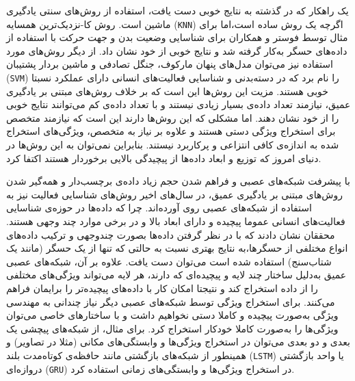 یک راهکار که در گذشته به نتایج خوبی دست یافت، استفاده از روش‌های سنتی یادگیری ماشین است. روش
کا-نزدیک‌ترین همسایه (\verb|KNN|)
اگرچه یک روش ساده است،‌اما برای مثال توسط
فوستر و همکاران\cite{foerster1999detection}
برای شناسایی وضعیت بدن و جهت حرکت با استفاده از داده‌های حسگر به‌کار گرفته شد و نتایج خوبی از خود نشان داد. از دیگر روش‌های مورد استفاده نیز می‌توان
مدل‌های پنهان مارکوف\cite{asghari2018activity}،
جنگل تصادفی\cite{attal2015physical}
و ماشین بردار پشتیبان (\verb|SVM|)\cite{attal2015physical}
را نام برد که در دسته‌بدنی و شناسایی فعالیت‌های انسانی دارای عملکرد نسبتا خوبی هستند. مزیت این روش‌ها این است که بر خلاف روش‌های مبتنی بر یادگیری عمیق،‌ نیازمند تعداد داده‌ی بسیار زیادی نیستند و با تعداد داده‌ی کم می‌توانند نتایج خوبی را از خود نشان دهند\cite{chen2021deep}.
اما مشکلی که این روش‌ها دارند این است که نیازمند متخصص برای
استخراج ویژگی دستی
هستند و علاوه بر نیاز به متخصص، ویژگی‌های استخراج شده به اندازه‌ی کافی
انتزاعی
و پرکاربرد نیستند. بنابراین نمی‌توان به این روش‌ها در دنیای امروز که توزیع و ابعاد داده‌ها از پیچیدگی بالایی برخوردار هستند اکتفا کرد.

با پیشرفت شبکه‌های عصبی و فراهم شدن حجم زیاد داده‌ی برچسب‌دار و همه‌گیر شدن روش‌های مبتنی بر یادگیری عمیق، در سال‌های اخیر روش‌های شناسایی فعالیت نیز به استفاده از شبکه‌های عصبی روی آورده‌اند. چرا که داده‌ها در حوزه‌ی شناسایی فعالیت‌های انسانی عموما پیچیده و دارای ابعاد بالا و در برخی موارد چند وجهی هستند. محققان نشان دادند که با در نظر گرفتن داده‌ها بصورت چندوجهی و ترکیب داده‌های انواع مختلفی از حسگرها،‌به نتایج بهتری نسبت به حالتی که تنها از یک حسگر (مانند یک شتاب‌سنج) استفاده شده است می‌توان دست یافت\cite{guo2016wearable}.
علاوه بر آن، شبکه‌های عصبی عمیق به‌دلیل ساختار چند لایه و پیچیده‌ای که دارند، هر لایه می‌تواند ویژگی‌های مختلفی را از داده استخراج کند و نتیجتا امکان کار با داده‌های پیچیده‌تر را برایمان فراهم می‌کنند. برای استخراج ویژگی توسط شبکه‌های عصبی دیگر نیاز چندانی به مهندسی ویژگی به‌صورت پیچیده و کاملا دستی نخواهیم داشت و با ساختارهای خاصی می‌توان ویژگی‌ها را به‌صورت کاملا خودکار استخراج کرد\cite{kumar2024human}. برای مثال، از شبکه‌های پیچشی یک بعدی و دو بعدی می‌توان در استخراج ویژگی‌ها و
وابستگی‌های مکانی
(مثلا در تصاویر)
و همینطور از شبکه‌های بازگشتی
مانند حافظه‌ی کوتاه‌مدت بلند (\verb|LSTM|)
یا واحد بازگشتی دروازه‌ای (\verb|GRU|)
در استخراج ویژگی‌ها و وابستگی‌های زمانی استفاده کرد.

